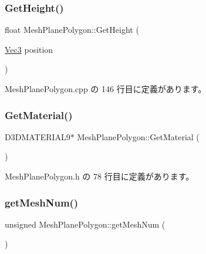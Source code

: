 \subsubsection{\texorpdfstring{Get\+Height()}{GetHeight()}}
{\footnotesize\ttfamily float Mesh\+Plane\+Polygon\+::\+Get\+Height (\begin{DoxyParamCaption}\item[{\mbox{\hyperlink{_vector3_d_8h_ab16f59e4393f29a01ec8b9bbbabbe65d}{Vec3}}}]{position }\end{DoxyParamCaption})}



 Mesh\+Plane\+Polygon.\+cpp の 146 行目に定義があります。

\mbox{\label{class_mesh_plane_polygon_a1188cf0072e000227ecce6210ba2778c}} 
\subsubsection{\texorpdfstring{Get\+Material()}{GetMaterial()}}
{\footnotesize\ttfamily D3\+D\+M\+A\+T\+E\+R\+I\+A\+L9$\ast$ Mesh\+Plane\+Polygon\+::\+Get\+Material (\begin{DoxyParamCaption}{ }\end{DoxyParamCaption})\hspace{0.3cm}{\ttfamily [inline]}}



 Mesh\+Plane\+Polygon.\+h の 78 行目に定義があります。

\mbox{\label{class_mesh_plane_polygon_a1850ae9039b99d29b709b17224b49fa5}} 
\subsubsection{\texorpdfstring{get\+Mesh\+Num()}{getMeshNum()}}
{\footnotesize\ttfamily unsigned Mesh\+Plane\+Polygon\+::get\+Mesh\+Num (\begin{DoxyParamCaption}{ }\end{DoxyParamCaption})\hspace{0.3cm}{\ttfamily [inline]}}



